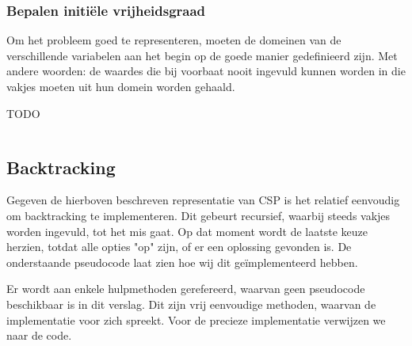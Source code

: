\documentclass[]{report}
\begin{document}
\subsubsection{Bepalen initi\"{e}le vrijheidsgraad}
Om het probleem goed te representeren, moeten de domeinen van de verschillende variabelen aan het begin op de goede manier gedefinieerd zijn. Met andere woorden: de waardes die bij voorbaat nooit ingevuld kunnen worden in die vakjes moeten uit hun domein worden gehaald.

TODO

\begin{minipage}{\textwidth}
\begin{lstlisting}
\end{lstlisting}
\end{minipage}

\subsection{Backtracking}
Gegeven de hierboven beschreven representatie van CSP is het relatief eenvoudig om backtracking te implementeren. Dit gebeurt recursief, waarbij steeds vakjes worden ingevuld, tot het mis gaat. Op dat moment wordt de laatste keuze herzien, totdat alle opties "op" zijn, of er een oplossing gevonden is. De onderstaande pseudocode laat zien hoe wij dit ge\"{i}mplementeerd hebben. 

Er wordt aan enkele hulpmethoden gerefereerd, waarvan geen pseudocode beschikbaar is in dit verslag. Dit zijn vrij eenvoudige methoden, waarvan de implementatie voor zich spreekt. Voor de precieze implementatie verwijzen we naar de code.
\end{document}
